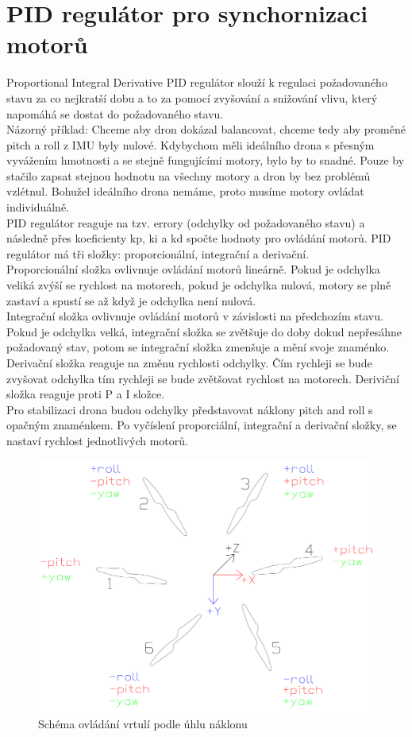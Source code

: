 \section{PID regulátor pro synchornizaci motorů} 
Proportional Integral Derivative
PID regulátor slouží k regulaci požadovaného stavu za co nejkratší dobu a to za pomocí zvyšování a snižování vlivu, který napomáhá se dostat do požadovaného stavu.\\
Názorný příklad:
Chceme aby dron dokázal balancovat, chceme tedy aby proměné pitch a roll z IMU byly nulové. Kdybychom měli ideálního drona s přesným vyvážením hmotnosti a se stejně fungujícími motory, bylo by to snadné. Pouze by stačilo zapsat stejnou hodnotu na všechny motory a dron by bez problémů vzlétnul. Bohužel ideálního drona nemáme, proto musíme motory ovládat individuálně.\\
PID regulátor reaguje na tzv. errory (odchylky od požadovaného stavu) a následně přes koeficienty kp, ki a kd spočte hodnoty pro ovládání motorů.
PID regulátor má tři složky: proporcionální, integrační a derivační.\\
Proporcionální složka ovlivnuje ovládání motorů lineárně. Pokud je odchylka veliká zvýší se rychlost na motorech, pokud je odchylka nulová, motory se plně zastaví a spustí se až když je odchylka není nulová.\\
Integrační složka ovlivnuje ovládání motorů v závislosti na předchozím stavu. Pokud je odchylka velká, integrační složka se zvětšuje do doby dokud nepřesáhne požadovaný stav, potom se integrační složka zmenšuje a mění svoje znaménko.\\
Derivační složka reaguje na změnu rychlosti odchylky. Čím rychleji se bude zvyšovat odchylka tím rychleji se bude zvětšovat rychlost na motorech. Deriviční složka reaguje proti P a I složce.\\
Pro stabilizaci drona budou odchylky představovat náklony pitch and roll s opačným znaménkem. Po vyčíslení proporciální, integrační  a derivační složky, se nastaví rychlost jednotlivých motorů.

\begin{figure}[h]
	\centering
	\includegraphics[width=12cm]{pictures/pid.pdf}
	\caption{Schéma ovládání vrtulí podle úhlu náklonu}
\end{figure}

